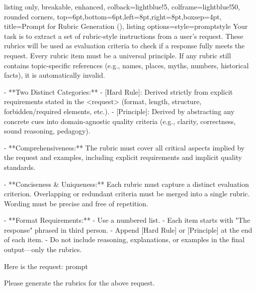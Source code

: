 \UseRawInputEncoding


\begin{table}
\begin{tcblisting}{
  listing only,
  breakable,
  enhanced,
  colback=lightblue!5,
  colframe=lightblue!50,
  rounded corners,
  top=6pt,bottom=6pt,left=8pt,right=8pt,boxsep=4pt,
  title=Prompt for Rubric Generation ({\name}),
  listing options={style=promptstyle}
}
Your task is to extract a set of rubric-style instructions from a user's request.
These rubrics will be used as evaluation criteria to check if a response fully meets the request.
Every rubric item must be a universal principle. If any rubric still contains topic-specific references (e.g., names, places, myths, numbers, historical facts), it is automatically invalid.

- **Two Distinct Categories:**
  - [Hard Rule]: Derived strictly from explicit requirements stated in the <request> (format, length, structure, forbidden/required elements, etc.).
  - [Principle]: Derived by abstracting any concrete cues into domain-agnostic quality criteria (e.g., clarity, correctness, sound reasoning, pedagogy).

- **Comprehensiveness:**
  The rubric must cover all critical aspects implied by the request and examples, including explicit requirements and implicit quality standards.

- **Conciseness & Uniqueness:**
  Each rubric must capture a distinct evaluation criterion. Overlapping or redundant criteria must be merged into a single rubric. Wording must be precise and free of repetition.

- **Format Requirements:**
  - Use a numbered list.
  - Each item starts with "The response" phrased in third person.
  - Append [Hard Rule] or [Principle] at the end of each item.
  - Do not include reasoning, explanations, or examples in the final output—only the rubrics.

Here is the request:
{prompt}

Please generate the rubrics for the above request.
\end{tcblisting}
\end{table}